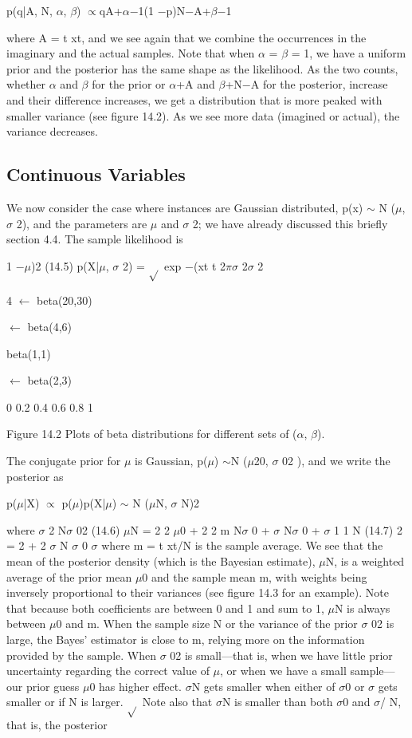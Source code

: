 p(q|A, N, $\alpha$, $\beta$) $\propto$qA+$\alpha$$-$1(1 $-$p)N$-$A+$\beta$$-$1

where A = t xt, and we see again that we combine the occurrences in the imaginary and the actual samples. Note that when $\alpha$ = $\beta$ = 1, we have a uniform prior and the posterior has the same shape as the likelihood. As the two counts, whether $\alpha$ and $\beta$ for the prior or $\alpha$+A and $\beta$+N$-$A for the posterior, increase and their difference increases, we get a distribution that is more peaked with smaller variance (see figure 14.2). As we see more data (imagined or actual), the variance decreases.

\subsection{Continuous Variables}

We now consider the case where instances are Gaussian distributed, p(x) $\sim$ N ($\mu$, $\sigma$ 2), and the parameters are $\mu$ and $\sigma$ 2; we have already discussed this briefly section 4.4. The sample likelihood is

1 $-$$\mu$)2 (14.5) p(X|$\mu$, $\sigma$ 2) = $\sqrt{}$ exp $-$(xt t 2$\pi$$\sigma$ 2$\sigma$ 2

4 $\leftarrow$ beta(20,30)

$\leftarrow$ beta(4,6)

beta(1,1)

$\leftarrow$ beta(2,3)

0 0.2 0.4 0.6 0.8 1

Figure 14.2 Plots of beta distributions for different sets of ($\alpha$, $\beta$).

The conjugate prior for $\mu$ is Gaussian, p($\mu$) $\sim$N ($\mu$20, $\sigma$ 02 ), and we write the posterior as

p($\mu$|X) $\propto$ p($\mu$)p(X|$\mu$) $\sim$ N ($\mu$N, $\sigma$ N)2

where $\sigma$ 2 N$\sigma$ 02 (14.6) $\mu$N = 2 2 $\mu$0 + 2 2 m N$\sigma$ 0 + $\sigma$ N$\sigma$ 0 + $\sigma$ 1 1 N (14.7) 2 = 2 + 2 $\sigma$ N $\sigma$ 0 $\sigma$ where m = t xt/N is the sample average. We see that the mean of the posterior density (which is the Bayesian estimate), $\mu$N, is a weighted average of the prior mean $\mu$0 and the sample mean m, with weights being inversely proportional to their variances (see figure 14.3 for an example). Note that because both coefficients are between 0 and 1 and sum to 1, $\mu$N is always between $\mu$0 and m. When the sample size N or the variance of the prior $\sigma$ 02 is large, the Bayes’ estimator is close to m, relying more on the information provided by the sample. When $\sigma$ 02 is small---that is, when we have little prior uncertainty regarding the correct value of $\mu$, or when we have a small sample---our prior guess $\mu$0 has higher effect. $\sigma$N gets smaller when either of $\sigma$0 or $\sigma$ gets smaller or if N is larger. $\sqrt{}$ Note also that $\sigma$N is smaller than both $\sigma$0 and $\sigma$/ N, that is, the posterior

